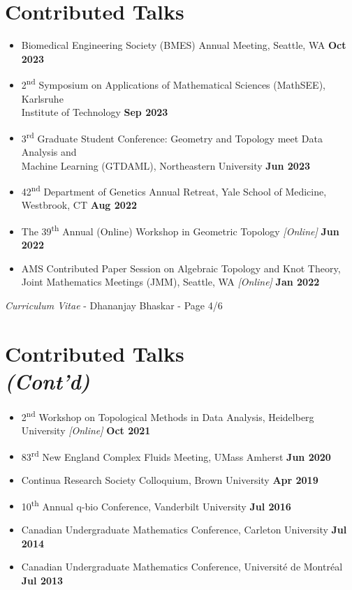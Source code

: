 \documentclass[margin,line]{res}
\begin{document}
\begin{resume}
\section{\sc Contributed Talks}
{\renewcommand\leftmargini{0em}
\begin{itemize}
\setlength\itemsep{0.3em}
\item[] Biomedical Engineering Society (BMES) Annual Meeting, Seattle, WA \hfill {\bf Oct 2023}
\item[] 2\textsuperscript{nd} Symposium on Applications of Mathematical Sciences (MathSEE), Karlsruhe \\ Institute of Technology \hfill {\bf Sep 2023}
\item[] 3\textsuperscript{rd} Graduate Student Conference: Geometry and Topology meet Data Analysis and \\Machine Learning (GTDAML), Northeastern University \hfill {\bf Jun 2023}
\item[] 42\textsuperscript{nd} Department of Genetics Annual Retreat, Yale School of Medicine, Westbrook, CT \hfill {\bf Aug 2022}
\item[] The 39\textsuperscript{th} Annual (Online) Workshop in Geometric Topology \textit{[Online]} \hfill {\bf Jun 2022}
\item[] AMS Contributed Paper Session on Algebraic Topology and Knot Theory, \\Joint Mathematics Meetings (JMM), Seattle, WA \textit{[Online]} \hfill {\bf Jan 2022} 
\end{itemize}
}

\newpage
\begin{flushright}
\textit{Curriculum Vitae} - Dhananjay Bhaskar - Page 4/6
\end{flushright}
\vspace*{.02cm}

\section{\sc Contributed Talks\\\textit{(Cont'd)}}
{\renewcommand\leftmargini{0em}
\begin{itemize}
\setlength\itemsep{0.3em}
\item[] 2\textsuperscript{nd} Workshop on Topological Methods in Data Analysis, Heidelberg University \textit{[Online]} \hfill {\bf Oct 2021}
\item[] 83\textsuperscript{rd} New England Complex Fluids Meeting, UMass Amherst \hfill {\bf Jun 2020}
\item[] Continua Research Society Colloquium, Brown University \hfill {\bf Apr 2019}
\item[] 10\textsuperscript{th} Annual q-bio Conference, Vanderbilt University \hfill {\bf Jul 2016}
\item[] Canadian Undergraduate Mathematics Conference, Carleton University \hfill {\bf Jul 2014}
\item[] Canadian Undergraduate Mathematics Conference, Universit\'e de Montr\'eal \hfill {\bf Jul 2013}
\end{itemize}
}


\end{resume}
\end{document}
